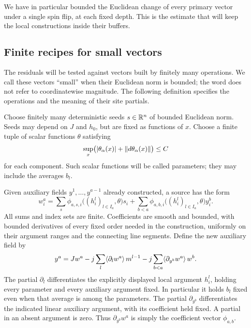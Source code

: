 We have in particular bounded the Euclidean change of every primary
vector under a single spin flip, at each fixed depth. This is the estimate
that will keep the local constructions inside their buffers.

\subsection{Finite recipes for small vectors}

The residuals will be tested against vectors built by finitely many
operations. We call these vectors ``small'' when their Euclidean norm is
bounded; the word does not refer to coordinatewise magnitude. The following
definition specifies the operations and the meaning of their site partials.

\begin{definition}\label{def:small-recipe}
Choose finitely many deterministic seeds $s\in\mathbb R^n$ of bounded Euclidean
norm.  Seeds may depend on $J$ and $h_0$, but are fixed as functions of $x$.
Choose a finite tuple of scalar functions $\theta$ satisfying
\[
 \sup_x\bigl(|\theta_\alpha(x)|+\lVert d\theta_\alpha(x)\rVert\bigr)\leq C
\]
for each component.  Such scalar functions will be called parameters; they
may include the averages $b_l$.

Given auxiliary fields $y^1,\ldots,y^{a-1}$ already constructed, a source
has the form
\begin{equation}
 w_i^a=\sum_{s}\phi_{a,s,i}\bigl((h_i^l)_{l\in I_a},\theta\bigr)s_i
       +\sum_{b<a}\phi_{a,b,i}\bigl((h_i^l)_{l\in I_a},\theta\bigr)y_i^b.
 \label{eq:source-form}
\end{equation}
All sums and index sets are finite.  Coefficients are smooth and bounded,
with bounded derivatives of every fixed order needed in the construction,
uniformly on their argument ranges and the connecting line segments.
Define the new auxiliary field by
\begin{equation}
 y^a=Jw^a
       -j\sum_l\langle \partial_lw^a\rangle\,m^{l-1}
       -j\sum_{b<a}\langle \partial_{y^b}w^a\rangle\,w^b.
 \label{eq:small-field}
\end{equation}
The partial $\partial_l$ differentiates the explicitly displayed local
argument $h_i^l$, holding every parameter and every auxiliary argument fixed.
In particular it holds $b_l$ fixed even when that average is among the
parameters.  The partial $\partial_{y^b}$ differentiates the indicated
linear auxiliary argument, with its coefficient held fixed.  A partial in
an absent argument is zero.  Thus $\partial_{y^b}w^a$ is simply the
coefficient vector $\phi_{a,b}$.


\end{definition}
